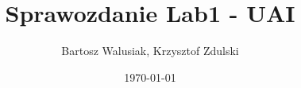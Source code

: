 \documentclass[a4paper,12pt]{article}
\begin{document}
    \title{Sprawozdanie Lab1 - UAI}
    \author{Bartosz Walusiak, Krzysztof Zdulski}
    \date{\today}
    \maketitle

    \tableofcontents
\end{document}
